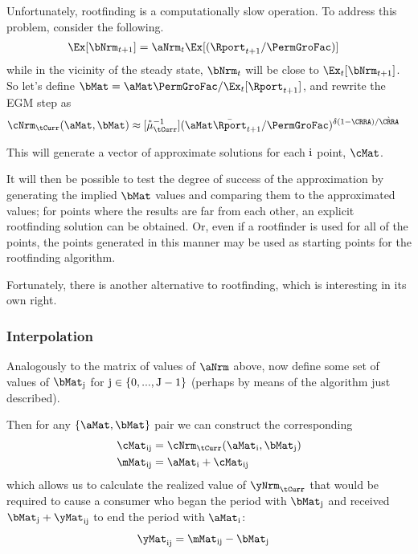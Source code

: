 \documentclass[./SolvingMicroDSOPs]{subfiles}
\begin{document}
{		Unfortunately, rootfinding is a computationally slow operation.  To address this problem, consider the following.
		\begin{align}
			\Ex[\bNrm_{t+1}] & = \aNrm_{t}\Ex[(\Rport_{t+1}/\PermGroFac)]
		\end{align}
		while in the vicinity of the steady state, $\bNrm_{t}$ will be close to $\Ex_{t}[\bNrm_{t+1}]$.  So let's define $\bMat= \aMat \PermGroFac/\Ex_{t}[\Rport_{t+1}]$, and rewrite the EGM step as 
		\begin{align*}
			\mathfrak{\cNrm}_{\tCurr}(\aMat,\bMat) & \approx \muInvVect(\aMat \bar{\Rport}_{t+1}/\PermGroFac)^{\wealthU(1-\CRRA)/\grave{\CRRA}}
		\end{align*}
		
		This will generate a vector of approximate solutions for each $\mathrm{i}$ point, $\cMat$.  %
		
		It will then be possible to test the degree of success of the approximation by generating the implied $\bMat$ values and comparing them to the approximated values; for points where the results are far from each other, an explicit rootfinding solution can be obtained.  Or, even if a rootfinder is used for all of the points, the points generated in this manner may be used as starting points for the rootfinding algorithm.
		
		Fortunately, there is another alternative to rootfinding, which is interesting in its own right.  
		\subsubsection{Interpolation}
		
		Analogously to the matrix of values of $\aNrm$ above, now define some set of values of $\bMat_{\bIdx}$ for $\mathrm{j} \in \{0,...,\mathrm{J}-1\}$ (perhaps by means of the algorithm just described).
		
		Then for any $\{\aMat,\bMat\}$ pair we can construct the corresponding
		\begin{align}
			\cMat_{\aIdx\bIdx} & = \mathfrak{\cNrm}_{\tCurr}(\aMat_{\aIdx},\bMat_{\bIdx})
			\\ \mMat_{\aIdx\bIdx} & = \aMat_{\aIdx}+\cMat_{\aIdx\bIdx}                       
		\end{align}
		which allows us to calculate the realized value of $\yNrm_{\tCurr}$ that would be required to cause a consumer who began the period with $\bMat_{\bIdx}$ and received $\bMat_{\bIdx}+\yMat_{\aIdx\bIdx}$ to end the period with $\aMat_{\aIdx}$:
		\begin{align}
			\yMat_{\aIdx\bIdx} & = \mMat_{\aIdx\bIdx}-\bMat_{\bIdx}
		\end{align}
		
}
\end{document}
